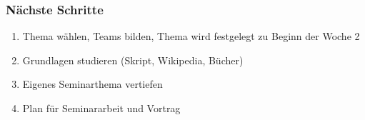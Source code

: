%
%
%

\begin{frame}
\frametitle{Nächste Schritte}

\begin{enumerate}
\item<2->
Thema wählen, Teams bilden, Thema wird festgelegt zu Beginn der Woche 2
\item<3->
Grundlagen studieren (Skript, Wikipedia, Bücher)
\item<4->
Eigenes Seminarthema vertiefen 
\item <5->
Plan für Seminararbeit und Vortrag
\end{enumerate}

\end{frame}
